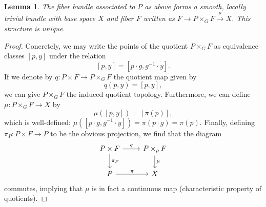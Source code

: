\documentclass{book}
\theoremstyle{plain}
\newtheorem{lem}[thm]{Lemma}
\theoremstyle{definition}
\theoremstyle{remark}
\begin{document}
\begin{lem}
    The fiber bundle associated to $P$ as above forms a smooth, locally trivial bundle with base space $X$ and fiber $F$
    written as $F\to P\times_GF\xrightarrow{\mu}X$. This structure is unique.
\end{lem}
\begin{proof}
    Concretely, we may write the points of the quotient $P\times_G F$ as equivalence classes $[p,y]$ under the relation
    \[[p,y]=[p\cdot g,g^{-1}\cdot y].\]
    If we denote by $q:P\times F\to P\times_G F$ the quotient map given by
    \[q(p,y)=[p,y],\]
    we can give $P\times_G F$ the induced quotient topology. Furthermore, we can define $\mu:P\times_G F\to X$ by
    \[\mu([p,y])=[\pi(p)],\]
    which is well-defined: $\mu([p\cdot g,g^{-1}\cdot y])=\pi(p\cdot g)=\pi(p)$. Finally, defining
    $\pi_P:P\times F\to P$ to be the obvious projection, we find that the diagram
    \begin{equation*}
        \begin{tikzcd}
            P\times F\arrow{r}{q}\arrow{d}{\pi_P}&P\times_\rho F\arrow{d}{\mu}\\
            P\arrow{r}{\pi}&X
        \end{tikzcd}
    \end{equation*}
    commutes, implying that $\mu$ is in fact a continuous map (characteristic property of quotients).
    

\end{proof}
\end{document}
